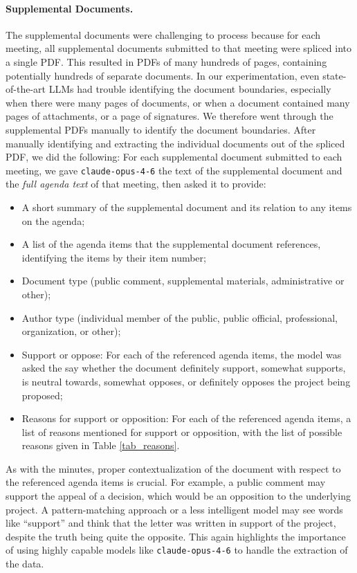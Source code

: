 \paragraph{Supplemental Documents.} The supplemental documents were challenging to process because for each meeting, all supplemental documents submitted to that meeting were spliced into a single PDF. This resulted in PDFs of many hundreds of pages, containing potentially hundreds of separate documents. In our experimentation, even state-of-the-art LLMs had trouble identifying the document boundaries, especially when there were many pages of documents, or when a document contained many pages of attachments, or a page of signatures. We therefore went through the supplemental PDFs manually to identify the document boundaries. After manually identifying and extracting the individual documents out of the spliced PDF, we did the following: For each supplemental document submitted to each meeting, we gave \texttt{claude-opus-4-6} the text of the supplemental document and the \emph{full agenda text} of that meeting, then asked it to provide:
\begin{itemize}
\item A short summary of the supplemental document and its relation to any items on the agenda;
\item A list of the agenda items that the supplemental document references, identifying the items by their item number;
\item Document type (public comment, supplemental materials, administrative or other);
\item Author type (individual member of the public, public official, professional, organization, or other);
\item Support or oppose: For each of the referenced agenda items, the model was asked the say whether the document definitely support, somewhat supports, is neutral towards, somewhat opposes, or definitely opposes the project being proposed;
\item Reasons for support or opposition: For each of the referenced agenda items, a list of reasons mentioned for support or opposition, with the list of possible reasons given in Table \ref{tab_reasons}.
\end{itemize}
\noindent As with the minutes, proper contextualization of the document with respect to the referenced agenda items is crucial. For example, a public comment may support the appeal of a decision, which would be an opposition to the underlying project. A pattern-matching approach or a less intelligent model may see words like ``support'' and think that the letter was written in support of the project, despite the truth being quite the opposite. This again highlights the importance of using highly capable models like \texttt{claude-opus-4-6} to handle the extraction of the data.

